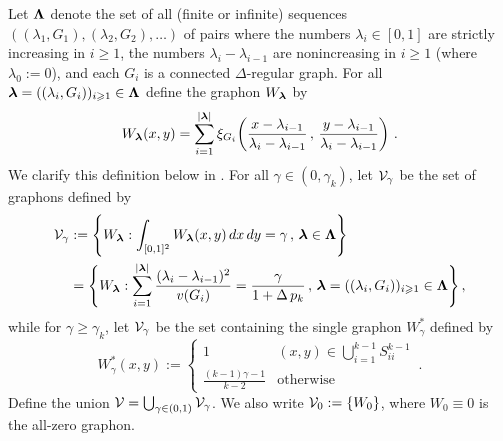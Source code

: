 Let ${\boldsymbol{\Lambda}}$ denote the set of all (finite or infinite) sequences $((\lambda_1,G_1),(\lambda_2,G_2),\dots)$ of pairs where the numbers $\lambda_i\in[0,1]$ are strictly increasing in $i\geq1$, the numbers $\lambda_i-\lambda_{i-1}$ are nonincreasing in $i\geq1$ (where $\lambda_0:=0$), and each $G_i$ is a connected $\Delta$-regular graph. For all ${\boldsymbol{\lambda}}=((\lambda_i,G_i))_{i\geqslant1}\in{\boldsymbol{\Lambda}}$ define the graphon $W_{\boldsymbol{\lambda}}$ by
\begin{equation}\label{eqn:Wblambda}
W_{\boldsymbol{\lambda}}(x,y)=\sum_{i=1}^{\lvert{\boldsymbol{\lambda}}\rvert}\xi_{G_i}\!\left(\frac{x-\lambda_{i-1}}{\lambda_{i}-\lambda_{i-1}}\,,\,\frac{y-\lambda_{i-1}}{\lambda_{i}-\lambda_{i-1}}\right)\,.
\end{equation}
We clarify this definition below in . For all $\gamma\in(0,\gamma_k)$, let ${\mathcal V}_{\gamma}$ be the set of graphons defined by
\begin{align}
{\mathcal V}_{\gamma} &:= \left\{W_{\boldsymbol{\lambda}}:\int_{[0,1]^2}W_{\boldsymbol{\lambda}}(x,y)\,dx\,dy=\gamma\,,\,{\boldsymbol{\lambda}}\in{\boldsymbol{\Lambda}}\right\} \nonumber\\
&= \Bigg\{W_{\boldsymbol{\lambda}}:\sum_{i=1}^{\lvert{\boldsymbol{\lambda}}\rvert}\frac{(\lambda_{i}-\lambda_{i-1})^2}{v(G_i)}=\frac{\gamma}{1+\Delta\,p_k}\,,\,{\boldsymbol{\lambda}}=((\lambda_i,G_i))_{i\geqslant1}\in{\boldsymbol{\Lambda}}\Bigg\}\,,\label{eqn:vgamma-condition}
\end{align}
while for $\gamma\geq\gamma_k$, let ${\mathcal V}_{\gamma}$ be the set containing the single graphon $W^\ast_{\gamma}$ defined by
\begin{equation}\label{eqn:opt-graphon-super}
W^\ast_{\gamma}(x,y):=\begin{cases}1&(x,y)\in\bigcup_{i=1}^{k-1}S^{k-1}_{ii}\\[4pt]\frac{(k-1)\gamma-1}{k-2}&\text{otherwise}\end{cases}\,.
\end{equation}
Define the union ${\mathcal V}=\bigcup_{\gamma\in(0,1)}{\mathcal V}_\gamma$. We also write ${\mathcal V}_0:=\{W_0\}$, where $W_0\equiv0$ is the all-zero graphon.

